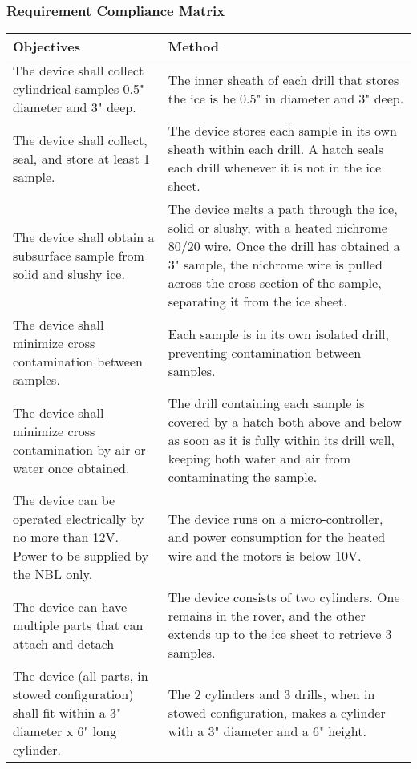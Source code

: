 \documentclass{article}
\begin{document}
\subsubsection{Requirement Compliance Matrix}
\begin{center}
    \begin{tabulary}{\linewidth}{|L|L|}
    \hline
    Objectives & Method \\
    \hline
    The device shall collect cylindrical samples 0.5" diameter and 3" deep. &
    The inner sheath of each drill that stores the ice is be 0.5" in diameter and 3" deep. \\
    \hline
    The device shall collect, seal, and store at least 1 sample. &
    The device stores each sample in its own sheath within each drill. A hatch seals each drill whenever it is not in the ice sheet. \\
    \hline
    The device shall obtain a subsurface sample from solid and slushy ice. &
    The device melts a path through the ice, solid or slushy, with a heated nichrome 80/20 wire. Once the drill has obtained a 3" sample, the nichrome wire is pulled across the cross section of the sample, separating it from the ice sheet. \\
    \hline
    The device shall minimize cross contamination between samples. &
    Each sample is in its own isolated drill, preventing contamination between samples. \\
    \hline
    The device shall minimize cross contamination by air or water once obtained. &
    The drill containing each sample is covered by a hatch both above and below as soon as it is fully within its drill well, keeping both water and air from contaminating the sample. \\
    \hline
    The device can be operated electrically by no more than 12V. Power to be supplied by the NBL only. &
    The device runs on a micro-controller, and power consumption for the heated wire and the motors is below 10V. \\
    \hline
    The device can have multiple parts that can attach and detach &
    The device consists of two cylinders. One remains in the rover, and the other extends up to the ice sheet to retrieve 3 samples. \\
    \hline
    The device (all parts, in stowed configuration) shall fit within a 3" diameter x 6" long cylinder. &
    The 2 cylinders and 3 drills, when in stowed configuration, makes a cylinder with a 3" diameter and a 6" height. \\

\end{tabulary}
\end{center}
\end{document}
